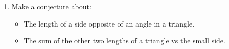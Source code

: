 \documentclass[12pt,letterpaper]{article}
\begin{document}
\begin{enumerate}
    \item Make a conjecture about:
          \begin{itemize}
              \item The length of a side opposite of an angle in a triangle.
              \item The sum of the other two lengths of a triangle vs the small side.
          \end{itemize}
\end{enumerate}
\end{document}
